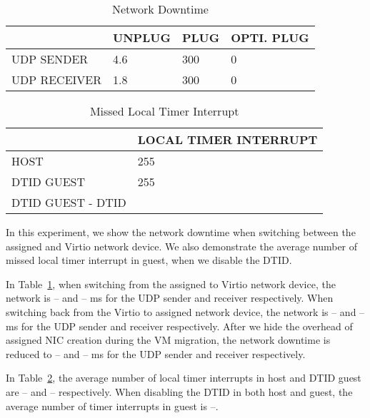 
\begin{table}[]
\begin{tabular}{|l|l|l|l|}
\hline
& UNPLUG & PLUG & OPTI. PLUG \\ \hline
UDP SENDER & 4.6 & 300 & 0 \\ \hline
UDP RECEIVER & 1.8 & 300 & 0 \\ \hline
\end{tabular}
\caption{Network Downtime}
\label{tab:migration_network_downtime}
\end{table}

\begin{table}[]
\begin{tabular}{|l|l|}
\hline
& LOCAL TIMER INTERRUPT \\ \hline
HOST & 255 \\ \hline
DTID GUEST & 255 \\ \hline
DTID GUEST - DTID &  \\ \hline
\end{tabular}
\caption{Missed Local Timer Interrupt}
\label{tab:migration_missed_loc}
\end{table}

In this experiment, we show the network downtime when
switching between the assigned and Virtio network device. We
also demonstrate the average number of missed local timer
interrupt in guest, when we disable the DTID.

In Table~\ref{tab:migration_network_downtime}, when switching
from the assigned to Virtio network device, the network is --
and -- ms for the UDP sender and receiver respectively. When
switching back from the Virtio to assigned network device, the
network is -- and -- ms for the UDP sender and receiver
respectively. After we hide the overhead of assigned NIC
creation during the VM migration, the network downtime is
reduced to -- and -- ms for the UDP sender and receiver
respectively.

In Table~\ref{tab:migration_missed_loc}, the average number of
local timer interrupts in host and DTID guest are -- and --
respectively. When disabling the DTID in both host and guest,
the average number of timer interrupts in guest is --.
